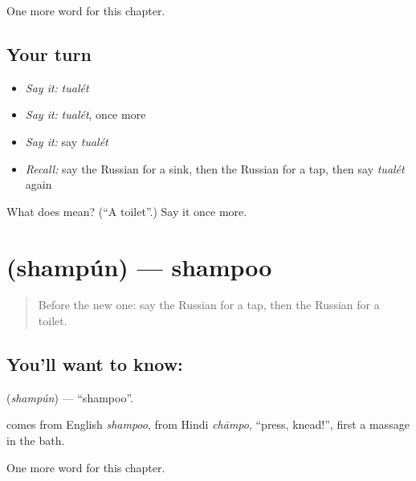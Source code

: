\begin{grammarlens}[title={What you've built}]
One more word for this chapter.
\end{grammarlens}

\subsection*{Your turn}
\begin{itemize}
\raggedright
  \item \emph{Say it:} \emph{tualét}
  \item \emph{Say it:} \emph{tualét}, once more
  \item \emph{Say it:} say \emph{tualét}
  \item \emph{Recall:} say the Russian for a sink, then the Russian for a tap, then say \emph{tualét} again
\end{itemize}

\begin{tcolorbox}[breakable,colback=teal!4,colframe=teal!35!black,title={Before you move on}]
What does  mean? (\textquotedblleft{}A toilet\textquotedblright{}.) Say it once more.
\end{tcolorbox}
\section[\texorpdfstring{\ru{шампунь} (shampún)}{шампунь (shampún)}]{ (shampún) — shampoo}

\label{lesson:RU-C190-shampun}



\begin{quote}
Before the new one: say the Russian for a tap, then the Russian for a toilet.
\end{quote}

\subsection*{You'll want to know: }
\textbf{} (\emph{shampún}) — \textquotedblleft{}shampoo\textquotedblright{}.

\begin{cousinweb}
\textbf{} comes from English \emph{shampoo}, from Hindi \emph{chāmpo}, \textquotedblleft{}press, knead!\textquotedblright{}, first a massage in the bath.
\end{cousinweb}

\begin{grammarlens}[title={What you've built}]
One more word for this chapter.
\end{grammarlens}

